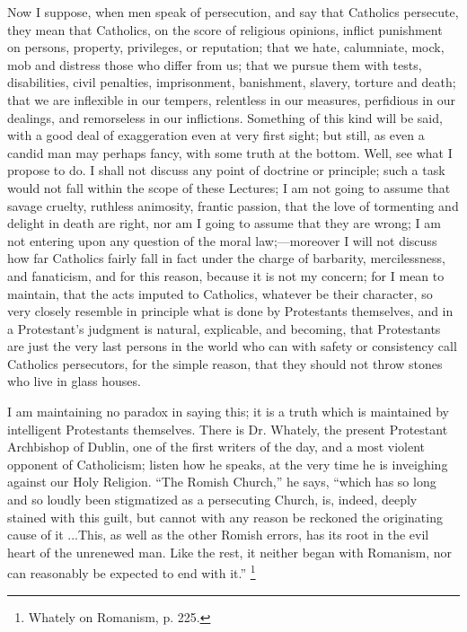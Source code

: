 Now I suppose, when men speak of persecution, and say
that Catholics persecute, they mean that Catholics, on
the score of religious opinions, inflict punishment on
persons, property, privileges, or reputation; that we
hate, calumniate, mock, mob and distress those who differ
from us; that we pursue them with tests, disabilities,
civil penalties, imprisonment, banishment, slavery,
torture and death; that we are inflexible in our tempers,
relentless in our measures, perfidious in our dealings,
and remorseless in our inflictions. Something of this
kind will be said, with a good deal of exaggeration even
at very first sight; but still, as even a candid man may
perhaps fancy, with some truth at the bottom. Well, see
what I propose to do. I shall not discuss any point of
doctrine or principle; such a task would not fall within
the scope of these Lectures; I am not going to assume
that savage cruelty, ruthless animosity, frantic passion,
that the love of tormenting and delight in death are
right, nor am I going to assume that they are wrong; I am
not entering upon any question of the moral
law;—moreover I will not discuss how far Catholics
fairly fall in fact under the charge of barbarity,
mercilessness, and fanaticism, and for this reason,
because it is not my concern; for I mean to maintain,
that the acts imputed to Catholics, whatever be their
character, so very closely resemble in principle what is
done by Protestants themselves, and in a Protestant's
judgment is natural, explicable, and becoming, that
Protestants are just the very last persons in the world
who can with safety or consistency call Catholics
persecutors, for the simple reason, that they should not
throw stones who live in glass houses.

I am maintaining no paradox in saying this; it is a
truth which is maintained by intelligent Protestants
themselves. There is Dr. Whately, the present Protestant
Archbishop of Dublin, one of the first writers of the
day, and a most violent opponent of Catholicism; listen
how he speaks, at the very time he is inveighing against
our Holy Religion. ``The Romish Church,'' he
says, ``which has so long and so loudly been
stigmatized as a persecuting Church, is, indeed, deeply
stained with this guilt, but cannot with any reason be
reckoned the originating cause of it ...This, as well
as the other Romish errors, has its root in the evil
heart of the unrenewed man. Like the rest, it neither
began with Romanism, nor can reasonably be expected to
end with it.'' \footnote{Whately on Romanism, p. 225.}

